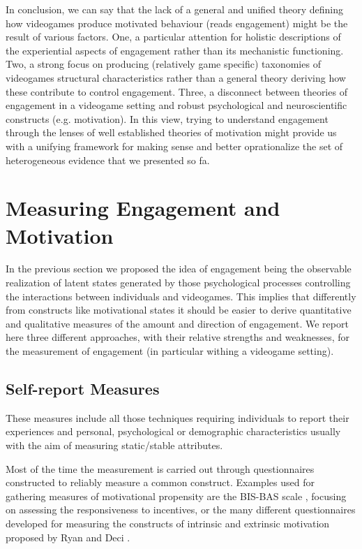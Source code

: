 In conclusion, we can say that the lack of a general and unified theory defining how videogames produce motivated behaviour (reads engagement) might be the result of various factors. One, a particular attention for holistic descriptions of the experiential aspects of engagement rather than its mechanistic functioning. Two, a strong focus on producing (relatively game specific) taxonomies of videogames structural characteristics rather than a general theory deriving how these contribute to control engagement. Three, a disconnect between theories of engagement in a videogame setting and robust psychological and neuroscientific constructs (e.g. motivation). In this view, trying to understand engagement through the lenses of well established theories of motivation might provide us with a unifying framework for making sense and better oprationalize the set of heterogeneous evidence that we presented so fa.

\section{Measuring Engagement and Motivation}
\label{measuring_motivation_engagement}
In the previous section we proposed the idea of engagement being the observable realization of latent states generated by those psychological processes controlling the interactions between individuals and videogames. This implies that differently from constructs like motivational states it should be easier to derive quantitative and qualitative measures of the amount and direction of engagement. We report here three different approaches, with their relative strengths and weaknesses, for the measurement of engagement (in particular withing a videogame setting).

\subsection{Self-report Measures}
\label{self_report}
These measures include all those techniques requiring individuals to report their experiences and personal, psychological or demographic characteristics usually with the aim of measuring static/stable attributes. 

Most of the time the measurement is carried out through questionnaires constructed to reliably measure a common construct. Examples used for gathering measures of motivational propensity are the BIS-BAS scale \cite{carver1994behavioral}, focusing on assessing the responsiveness to incentives, or the many different questionnaires developed for measuring the constructs of intrinsic and extrinsic motivation proposed by Ryan and Deci \cite{ryan2000self}. 

